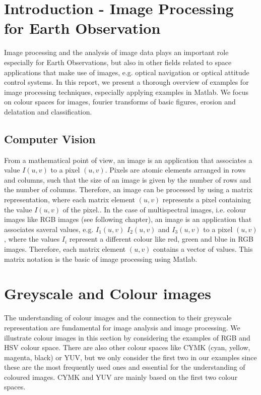 \section{Introduction - Image Processing for Earth Observation}
Image processing and the analysis of image data plays an important role especially for Earth Observations, but also in other fields related to space applications that make use of images, e.g. optical navigation or optical attitude control systems. In this report, we present a thorough overview of examples for image processing techniques, especially applying examples in Matlab. We focus on colour spaces for images, fourier transforms of basic figures, erosion and delatation and classification. 

\subsection{Computer Vision}
From a mathematical point of view, an image is an application that associates a value $I(u,v)$ to a pixel $(u,v)$. Pixels are atomic elements arranged in rows and columns,  such that the size of an image is given by the number of rows and the number of columns. Therefore, an image can be processed by using a matrix representation, where each matrix element $(u,v)$  represents a pixel containing the value $I(u,v)$ of the pixel.. In the case of multispectral images, i.e. colour images like RGB images (see following chapter), an image is an application that associates saveral values, e.g. $I_{1}(u,v)$ $I_{2}(u,v)$ and $I_{3}(u,v)$ to a pixel $(u,v)$, where the values $I_{i}$ represent a different colour like red, green and blue in RGB images. Therefore, each matrix element $(u,v)$ contains a vector of values. This matrix notation is the basic of image processing using Matlab.

\section{Greyscale and Colour images}
The understanding of colour images and the connection to their greyscale representation are fundamental for image analysis and image processing. We illustrate colour images in this section by  considering the examples of RGB and HSV colour space. There are also other colour spaces like CYMK (cyan, yellow, magenta, black) or YUV, but we only consider the first two in our examples since these are the most frequently used ones and essential for the understanding of coloured images. CYMK and YUV are mainly based on the first two colour spaces.

